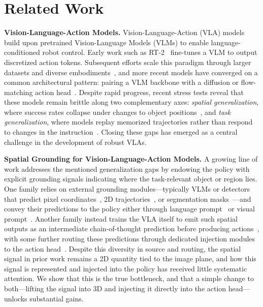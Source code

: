 \section{Related Work}
\noindent\textbf{Vision-Language-Action Models.}
Vision-Language-Action (VLA) models build upon pretrained Vision-Language Models (VLMs) to enable language-conditioned robot control. Early work such as RT-2~\cite{rt22023arxiv} fine-tunes a VLM to output discretized action tokens. Subsequent efforts scale this paradigm through larger datasets and diverse embodiments~\cite{open_x_embodiment_rt_x_2023, octo_2023, khazatsky2024droid, kim2024openvla}, and more recent models have converged on a common architectural pattern: pairing a VLM backbone with a diffusion or flow-matching action head~\cite{li2024cogact, pi0, pi05, gr00tn1_2025, molmobot}. Despite rapid progress, recent stress tests reveal that these models remain brittle along two complementary axes: \emph{spatial generalization}, where success rates collapse under changes to object positions~\cite{zhou2025liberopro, fei25libero-plus}, and \emph{task generalization}, where models replay memorized trajectories rather than respond to changes in the instruction~\cite{zhou2025liberopro}. Closing these gaps has emerged as a central challenge in the development of robust VLAs.

\noindent\textbf{Spatial Grounding for Vision-Language-Action Models.}
A growing line of work addresses the mentioned generalization gaps by endowing the policy with explicit grounding signals indicating where the task-relevant object or region lies. One family relies on external grounding modules---typically VLMs or detectors that predict pixel coordinates~\cite{yuan2024robopoint}, 2D trajectories~\cite{li2025hamster}, or segmentation masks~\cite{roboground}---and convey their predictions to the policy either through language prompt~\cite{molmobot} or visual prompt~\cite{moka, wang2026vp, li2025hamster}. Another family instead trains the VLA itself to emit such spatial outputs as an intermediate chain-of-thought prediction before producing actions~\cite{coavla, molmoact2025, ecot, steerablepolicy}, with some further routing these predictions through dedicated injection modules to the action head~\cite{coavla}. Despite this diversity in source and routing, the spatial signal in prior work remains a 2D quantity tied to the image plane, and how this signal is represented and injected into the policy has received little systematic attention. We show that this is the true bottleneck, and that a simple change to both---lifting the signal into 3D and injecting it directly into the action head---unlocks substantial gains.

